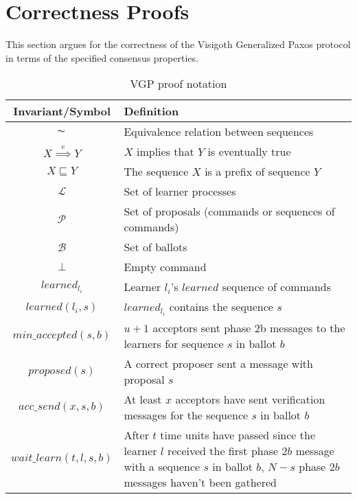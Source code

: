 \section{Correctness Proofs} \label{vft_proofs}

This section argues for the correctness of the Visigoth Generalized Paxos protocol in terms of the specified consensus properties.\par


\begin{table}[h!]
	\renewcommand{\arraystretch}{1.5}
	\centering
	\begin{tabularx}{\linewidth}{ |c|X|}
		\hline
		Invariant/Symbol & Definition \\
		\hline
		$\thicksim$ & Equivalence relation between sequences \\
		\hline
		$X \overset{e}{\implies} Y$ & $X$ implies that $Y$ is eventually true \\
		\hline
		$X \sqsubseteq Y$ & The sequence $X$ is a prefix of sequence $Y$ \\
		\hline
		$\mathcal{L}$ & Set of learner processes \\
		\hline
		$\mathcal{P}$ & Set of proposals (commands or sequences of commands) \\
		\hline
		$\mathcal{B}$ & Set of ballots \\
		\hline
		$\bot$ & Empty command \\
		\hline
		$learned_{l_i}$ & Learner $l_i$'s $learned$ sequence of commands \\
		\hline
		$learned(l_i,s)$ & $learned_{l_i}$ contains the sequence $s$ \\
		\hline
		$min\_accepted(s,b)$ & $u+1$ acceptors sent phase 2b messages to the learners for sequence $s$ in ballot $b$\\
		\hline
		$proposed(s)$ & A correct proposer sent a message with proposal $s$ \\
		\hline
		$acc\_send(x,s,b)$ & At least $x$ acceptors have sent verification messages for the sequence $s$ in ballot $b$\\
		\hline
		$wait\_learn(t,l,s,b)$ & After $t$ time units have passed since the learner $l$ received the first phase $2b$ message with a sequence $s$ in ballot $b$, $N-s$ phase $2b$ messages haven't been gathered\\
		\hline
  	\end{tabularx} 
	\caption{VGP proof notation} 
	\label{table:vft_proof}
\end{table}

